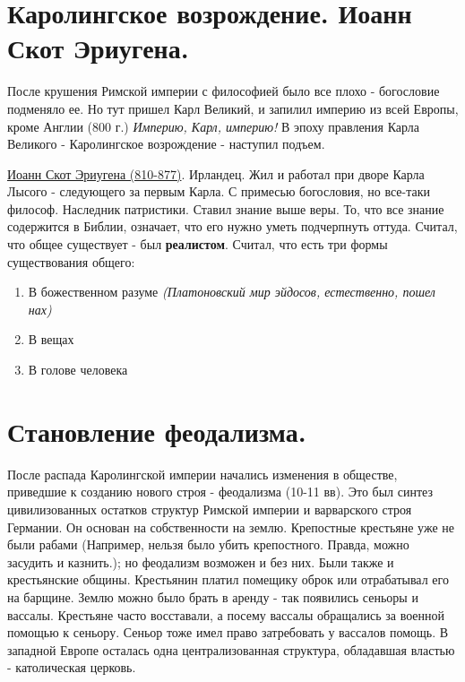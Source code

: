 \section{Каролингское возрождение. Иоанн Скот Эриугена.}
После крушения Римской империи с философией было все плохо - богословие подменяло ее. Но тут пришел Карл Великий, и запилил империю из всей Европы, кроме Англии (800 г.) \textit{Империю, Карл, империю!} В эпоху правления Карла Великого - Каролингское возрождение - наступил подъем. 

\underline{Иоанн Скот Эриугена (810-877)}. Ирландец. Жил и работал при дворе Карла Лысого - следующего за первым Карла. С примесью  богословия, но все-таки философ. Наследник патристики. Ставил знание выше веры. То, что все знание содержится в Библии, означает, что его нужно уметь подчерпнуть оттуда. Считал, что общее существует - был \textbf{реалистом}. Считал, что есть три формы существования общего: 
\begin{enumerate}
\item В божественном разуме \textit{(Платоновский мир эйдосов, естественно, пошел нах)}
\item В вещах
\item В голове человека
\end{enumerate}

\section{Становление феодализма.}
После распада Каролингской империи начались изменения в обществе, приведшие к созданию нового строя - феодализма (10-11 вв). Это был синтез цивилизованных остатков структур Римской империи и варварского строя Германии. 
Он основан на собственности на землю. Крепостные крестьяне уже не были рабами (Например, нельзя было убить крепостного. Правда, можно засудить и казнить.); но феодализм возможен и без них. Были также и крестьянские общины. Крестьянин платил помещику оброк или отрабатывал его на барщине. Землю можно было брать в аренду - так появились сеньоры и вассалы. Крестьяне часто восставали, а посему вассалы обращались за военной помощью к сеньору. Сеньор тоже имел право затребовать у вассалов помощь. В западной Европе осталась одна централизованная структура, обладавшая властью - католическая церковь.  


